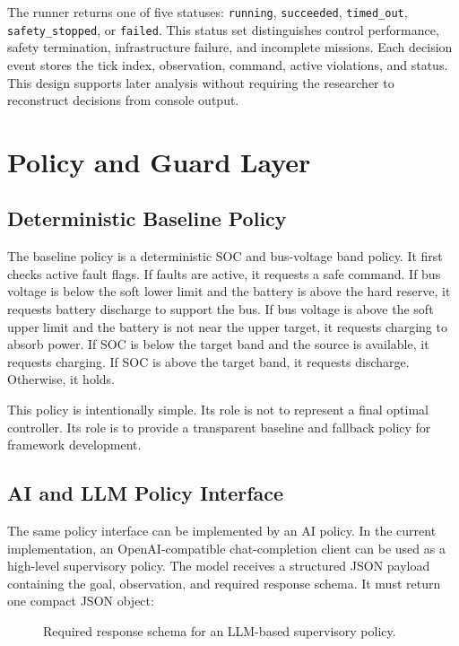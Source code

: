 \documentclass[conference]{IEEEtran}
\begin{document}
The runner returns one of five statuses: \texttt{running},
\texttt{succeeded}, \texttt{timed\_out}, \texttt{safety\_stopped}, or
\texttt{failed}. This status set distinguishes control performance, safety
termination, infrastructure failure, and incomplete missions. Each decision
event stores the tick index, observation, command, active violations, and
status. This design supports later analysis without requiring the researcher
to reconstruct decisions from console output.

\section{Policy and Guard Layer}

\subsection{Deterministic Baseline Policy}

The baseline policy is a deterministic SOC and bus-voltage band policy. It
first checks active fault flags. If faults are active, it requests a safe
command. If bus voltage is below the soft lower limit and the battery is above
the hard reserve, it requests battery discharge to support the bus. If bus
voltage is above the soft upper limit and the battery is not near the upper
target, it requests charging to absorb power. If SOC is below the target band
and the source is available, it requests charging. If SOC is above the target
band, it requests discharge. Otherwise, it holds.

This policy is intentionally simple. Its role is not to represent a final
optimal controller. Its role is to provide a transparent baseline and fallback
policy for framework development.

\subsection{AI and LLM Policy Interface}

The same policy interface can be implemented by an AI policy. In the current
implementation, an OpenAI-compatible chat-completion client can be used as a
high-level supervisory policy. The model receives a structured JSON payload
containing the goal, observation, and required response schema. It must return
one compact JSON object:

\begin{figure}[t]
\centering
{}
\caption{Required response schema for an LLM-based supervisory policy.}
\label{fig:llm_schema}
\end{figure}
\end{document}
